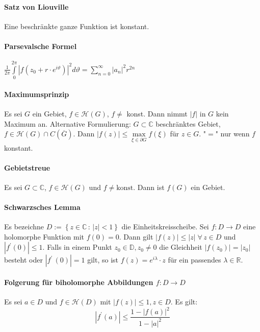 \documentclass[a4paper, 10pt, DIV20, headings=small]{scrartcl}
\theoremstyle{definition}
\theoremstyle{plain}
\begin{document}
\paragraph{Satz von Liouville}
Eine beschränkte ganze Funktion ist konstant.

\paragraph{Parsevalsche Formel}
$\frac{1}{2 \pi} \int\limits_{0}^{2 \pi}{|f(z_0 + r \cdot e^{i \vartheta})|^2 d \vartheta = \sum\limits_{n=0}^\infty |a_n|^2 r^{2n}}$

\paragraph{Maximumsprinzip}
Es sei $G$ ein Gebiet, $f \in \mathcal{H}(G)$, $f \neq$ konst. Dann nimmt $|f|$ in $G$ kein Maximum an.
Alternative Formulierung: 
$G \subset \mathbb{C}$ beschränktes Gebiet, $f \in \mathcal{H}(G) \cap C(\overline{G})$. Dann $|f(z)| \leq \max\limits_{\xi \in \partial G} f(\xi)$ für $z \in G$. "$=$" nur wenn $f$ konstant.

\paragraph{Gebietstreue}
Es sei $G \subset \mathbb{C}$, $f \in \mathcal{H}(G)$ und $f \neq \text{konst}$. Dann ist $f(G)$ ein Gebiet.

\paragraph{Schwarzsches Lemma}
Es bezeichne $D := \left\{z \in \mathbb{C} \,:\, |z| < 1 \right\}$ die Einheitskreisscheibe. Sei $f \colon D \to D$ eine holomorphe Funktion mit $f(0) = 0$. Dann gilt $|f(z)| \leq |z| \; \forall \, z \in D$ und $|f^\prime(0)|\leq 1$. Falls in einem Punkt $z_0 \in \mathbb{D}, z_0 \neq 0$ die Gleichheit $|f(z_0)| = |z_0|$ besteht oder $|f^\prime\!\,(0)| = 1$ gilt, so ist $f(z) = e^{i \lambda} \cdot z$ für ein passendes $\lambda \in \mathbb{R}$.

\paragraph{Folgerung für biholomorphe Abbildungen $f \colon D \rightarrow D$}
Es sei $a \in D$ und $f \in \mathcal{H}(D)$ mit $|f(z)| \leq 1, z \in D$. Es gilt:
$$|f^\prime(a)| \leq \frac{1 - |f(a)|^2}{1 - |a|^2}$$
\end{document}
